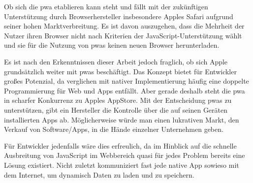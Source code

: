 Ob sich die \ac{pwa} etablieren kann steht und fällt mit der zukünftigen Unterstützung durch Browserhersteller insbesondere Apples Safari aufgrund seiner hohen Marktverbreitung. Es ist davon auszugehen, dass die Mehrheit der Nutzer ihren Browser nicht nach Kriterien der JavaScript-Unterstützung wählt und sie für die Nutzung von \ac{pwa}s keinen neuen Browser herunterladen.

Es ist nach den Erkenntnissen dieser Arbeit jedoch fraglich, ob sich Apple grundsätzlich weiter mit \ac{pwa}s beschäftigt. Das Konzept bietet für Entwickler großes Potenzial, da verglichen mit nativer Implementierung häufig eine doppelte Programmierung für Web und Apps entfällt. Aber gerade deshalb steht die \ac{pwa} in scharfer Konkurrenz zu Apples AppStore. Mit der Entscheidung \ac{pwa}s zu unterstützen, gibt ein Hersteller die Kontrolle über die auf seinen Geräten installierten Apps ab. 
Möglicherweise würde man einen lukrativen Markt, den Verkauf von Software/Apps, in die Hände einzelner Unternehmen geben.

Für Entwickler jedenfalls wäre dies erfreulich, da im Hinblick auf die schnelle Ausbreitung von JavaScript im Webbereich quasi für jedes Problem bereits eine Lösung existiert. Nicht zuletzt kommuniziert fast jede native App sowieso mit dem Internet, um dynamisch Daten zu laden und zu speichern.
